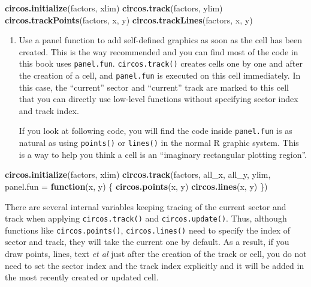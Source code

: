 \documentclass[]{book}
\newenvironment{Shaded}{\begin{snugshade}}{\end{snugshade}}
\newcommand{\KeywordTok}[1]{\textcolor[rgb]{0.13,0.29,0.53}{\textbf{#1}}}
\newcommand{\DataTypeTok}[1]{\textcolor[rgb]{0.13,0.29,0.53}{#1}}
\newcommand{\ControlFlowTok}[1]{\textcolor[rgb]{0.13,0.29,0.53}{\textbf{#1}}}
\newcommand{\NormalTok}[1]{#1}
\begin{document}
\begin{Shaded}
\begin{Highlighting}[]
\KeywordTok{circos.initialize}\NormalTok{(factors, xlim)}
\KeywordTok{circos.track}\NormalTok{(factors, ylim)}
\KeywordTok{circos.trackPoints}\NormalTok{(factors, x, y)}
\KeywordTok{circos.trackLines}\NormalTok{(factors, x, y)}
\end{Highlighting}
\end{Shaded}

\begin{enumerate}
\def\labelenumi{\arabic{enumi}.}
\setcounter{enumi}{2}
\item
  Use a panel function to add self-defined graphics as soon as the cell
  has been created. This is the way recommended and you can find most of
  the code in this book uses \texttt{panel.fun}. \texttt{circos.track()}
  creates cells one by one and after the creation of a cell, and
  \texttt{panel.fun} is executed on this cell immediately. In this case,
  the ``current'' sector and ``current'' track are marked to this cell
  that you can directly use low-level functions without specifying
  sector index and track index.

  If you look at following code, you will find the code inside
  \texttt{panel.fun} is as natural as using \texttt{points()} or
  \texttt{lines()} in the normal R graphic system. This is a way to help
  you think a cell is an ``imaginary rectangular plotting region''.
\end{enumerate}

\begin{Shaded}
\begin{Highlighting}[]
\KeywordTok{circos.initialize}\NormalTok{(factors, xlim)}
\KeywordTok{circos.track}\NormalTok{(factors, all_x, all_y, ylim,}
    \DataTypeTok{panel.fun =} \ControlFlowTok{function}\NormalTok{(x, y) \{}
        \KeywordTok{circos.points}\NormalTok{(x, y)}
        \KeywordTok{circos.lines}\NormalTok{(x, y)}
\NormalTok{\})}
\end{Highlighting}
\end{Shaded}

There are several internal variables keeping tracing of the current
sector and track when applying \texttt{circos.track()} and
\texttt{circos.update()}. Thus, although functions like
\texttt{circos.points()}, \texttt{circos.lines()} need to specify the
index of sector and track, they will take the current one by default. As
a result, if you draw points, lines, text \emph{et al} just after the
creation of the track or cell, you do not need to set the sector index
and the track index explicitly and it will be added in the most recently
created or updated cell.
\end{document}
